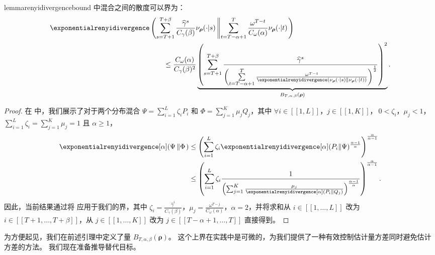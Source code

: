\begin{restatable}{lemma}{renyidivergencebound}
\label{pp:divergence_bound}
     中混合之间的散度可以界为：
\begin{align*}
    \exponentialrenyidivergence & \left( \sum_{s=T+1}^{T+\beta} \frac{\widehat{\gamma}^s}{C_\gamma(\beta)} \nu_{\boldsymbol\rho}(\cdot\vert s) \left\Vert  \sum_{t=T-\alpha+1}^{T} \frac{\omega^{T-t} }{C_\omega(\alpha)}\nu_{\boldsymbol\rho}(\cdot\vert t)  \right.\right)
    \\
    & \qquad \le \frac{C_\omega(\alpha)}{C_\gamma(\beta)^2} \underbrace{\left(\sum_{s=T+1}^{T+\beta} \frac{\widehat{\gamma}^{s}}{\left(\sum\limits_{ t=T-\alpha+1}^{ T}\frac{\omega^{T-t}}{\exponentialrenyidivergence(\nu_{\boldsymbol\rho}(\cdot\vert s)\left\Vert \nu_{\boldsymbol\rho}(\cdot\vert t)\right)}\right)^{\frac{1}{2}}}\right)^2}_{{B}_{T,\alpha,\beta}(\boldsymbol\rho)}.
\end{align*}
\end{restatable}
\begin{proof}
    在  中，我们展示了对于两个分布混合 $\textstyle\Psi = \sum_{i=1}^L \zeta_i P_i$ 和 $\textstyle\Phi = \sum_{j=1}^K \mu_j Q_j$，其中 $\forall i \in [\![1,L]\!]$，$j \in [\![1,K]\!]$，$\ 0<\zeta_i$，$\mu_j <1$，$\textstyle\sum_{i=1}^L \zeta_i = \sum_{j=1}^K \mu_j= 1$ 且 $\alpha\ge1$，
    \begin{align*}
        \exponentialrenyidivergence[\alpha](\Psi\left\Vert \Phi\right.)
        &\leq
        \left(\sum_{i=1}^L \zeta_i \exponentialrenyidivergence[\alpha](P_i\Vert \Psi)^{\frac{\alpha-1}{\alpha}}\right)^{\frac{\alpha}{\alpha-1}}\\
        &\leq
        \left(\sum_{i=1}^L \zeta_i \frac{1}{\left(\sum_{j=1}^K\frac{\mu_j}{\exponentialrenyidivergence[\alpha]( P_i \Vert Q_j)}\right)^{\frac{\alpha-1}{\alpha}}}\right)^{\frac{\alpha}{\alpha-1}}.
    \end{align*}
    因此，当前结果通过将  应用于我们的界，其中 $\textstyle\zeta_i=\frac{\widehat{\gamma}^i}{C_\gamma(\beta)}$，$\textstyle\mu_j = \frac{\omega^{T-j}}{C_\omega(\alpha)}$，$\alpha=2$，并将求和从 $i\in[\![1,\dots,L]\!]$ 改为 $i\in[\![T+1,\dots,T+\beta]\!]$，从 $j\in[\![1,\dots,K]\!]$ 改为 $j\in[\![T-\alpha+1,\dots,T]\!]$ 直接得到。
\end{proof}

为方便起见，我们在前述引理中定义了量 ${B}_{T,\alpha,\beta}(\boldsymbol\rho)$。
这个上界在实践中是可微的，为我们提供了一种有效控制估计量方差同时避免估计方差的方法。
我们现在准备推导替代目标。

